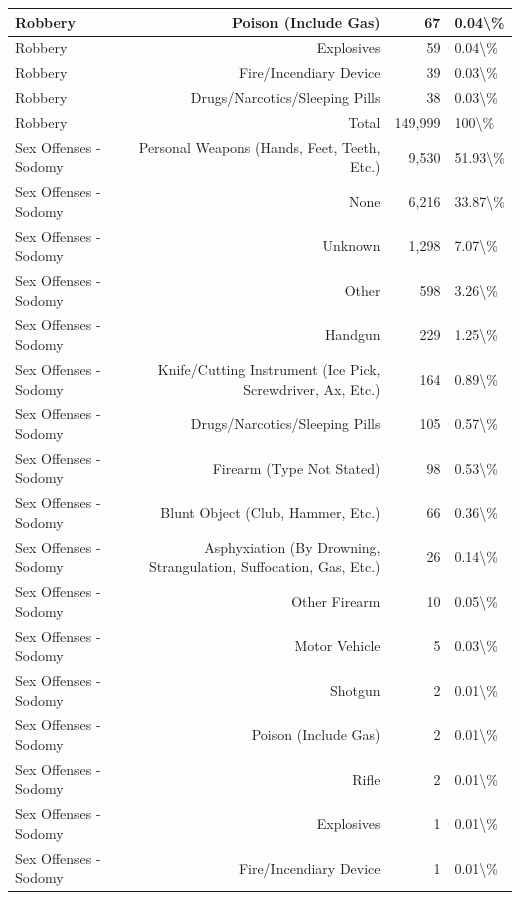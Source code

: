 \documentclass[
]{krantz}
\begin{document}
\begin{longtable}[t]{l|r|r|l}
Robbery & Poison (Include Gas) & 67 & 0.04\textbackslash{}\%\\
\hline
Robbery & Explosives & 59 & 0.04\textbackslash{}\%\\
\hline
Robbery & Fire/Incendiary Device & 39 & 0.03\textbackslash{}\%\\
\hline
Robbery & Drugs/Narcotics/Sleeping Pills & 38 & 0.03\textbackslash{}\%\\
\hline
Robbery & Total & 149,999 & 100\textbackslash{}\%\\
\hline
Sex Offenses - Sodomy & Personal Weapons (Hands, Feet, Teeth, Etc.) & 9,530 & 51.93\textbackslash{}\%\\
\hline
Sex Offenses - Sodomy & None & 6,216 & 33.87\textbackslash{}\%\\
\hline
Sex Offenses - Sodomy & Unknown & 1,298 & 7.07\textbackslash{}\%\\
\hline
Sex Offenses - Sodomy & Other & 598 & 3.26\textbackslash{}\%\\
\hline
Sex Offenses - Sodomy & Handgun & 229 & 1.25\textbackslash{}\%\\
\hline
Sex Offenses - Sodomy & Knife/Cutting Instrument (Ice Pick, Screwdriver, Ax, Etc.) & 164 & 0.89\textbackslash{}\%\\
\hline
Sex Offenses - Sodomy & Drugs/Narcotics/Sleeping Pills & 105 & 0.57\textbackslash{}\%\\
\hline
Sex Offenses - Sodomy & Firearm (Type Not Stated) & 98 & 0.53\textbackslash{}\%\\
\hline
Sex Offenses - Sodomy & Blunt Object (Club, Hammer, Etc.) & 66 & 0.36\textbackslash{}\%\\
\hline
Sex Offenses - Sodomy & Asphyxiation (By Drowning, Strangulation, Suffocation, Gas, Etc.) & 26 & 0.14\textbackslash{}\%\\
\hline
Sex Offenses - Sodomy & Other Firearm & 10 & 0.05\textbackslash{}\%\\
\hline
Sex Offenses - Sodomy & Motor Vehicle & 5 & 0.03\textbackslash{}\%\\
\hline
Sex Offenses - Sodomy & Shotgun & 2 & 0.01\textbackslash{}\%\\
\hline
Sex Offenses - Sodomy & Poison (Include Gas) & 2 & 0.01\textbackslash{}\%\\
\hline
Sex Offenses - Sodomy & Rifle & 2 & 0.01\textbackslash{}\%\\
\hline
Sex Offenses - Sodomy & Explosives & 1 & 0.01\textbackslash{}\%\\
\hline
Sex Offenses - Sodomy & Fire/Incendiary Device & 1 & 0.01\textbackslash{}\%\\

\end{longtable}
\end{document}
